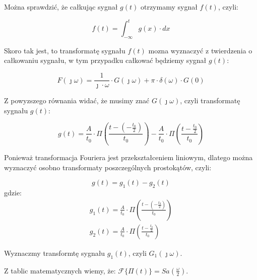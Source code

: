 \begin{task}
Można sprawdzić, że całkując sygnał $g(t)$ otrzymamy sygnał $f(t)$, czyli:

\begin{equation}
f(t) = \int_{-\infty}^{t} g(x) \cdot dx
\end{equation}

Skoro tak jest, to transformatę sygnału $f(t)$ mozna wyznaczyć z twierdzenia o całkowaniu sygnału, w tym przypadku całkować będziemy sygnał $g(t)$:

\begin{equation}
F(\jmath \omega) = \frac{1}{\jmath \cdot \omega} \cdot G(\jmath \omega) + \pi \cdot \delta(\omega) \cdot G(0)
\end{equation}

Z powyzszego równania widać, że musimy znać $G(\jmath \omega)$, czyli transformatę sygnału $g(t)$:

\begin{equation}
g(t) = \frac{A}{t_{0}} \cdot \Pi(\frac{t-(-\frac{t_{0}}{2})}{t_{0}})-\frac{A}{t_{0}} \cdot \Pi(\frac{t-\frac{t_{0}}{2}}{t_{0}})
\end{equation}

Ponieważ transformacja Fouriera jest przekształceniem liniowym, dlatego można wyznaczyć osobno transformaty poszczególnych prostokątów, czyli:

\begin{equation}
g(t) = g_{1}(t) - g_{2}(t)
\end{equation}
gdzie:
\begin{align*}
g_{1}(t) = \frac{A}{t_{0}} \cdot \Pi(\frac{t-(-\frac{t_{0}}{2})}{t_{0}})\\
g_{2}(t) = \frac{A}{t_{0}} \cdot \Pi(\frac{t-\frac{t_{0}}{2}}{t_{0}})
\end{align*}

Wyznaczmy transformtę sygnału $g_{1}(t)$, czyli $G_{1}(\jmath \omega)$.

Z tablic matematycznych wiemy, że:
$\mathcal F \{\Pi(t)\} = Sa\left(\frac{\omega}{2}\right)$.


\end{task}
